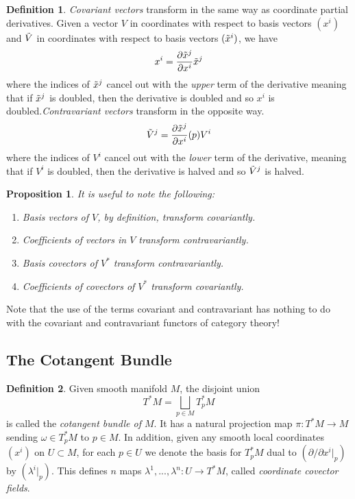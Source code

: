 \documentclass{article}
\newtheorem{proposition}[theorem]{Proposition}
\theoremstyle{remark}
\theoremstyle{definition}
\newtheorem{definition}{Definition}[section]
\begin{document}
      \begin{definition}
      \textit{Covariant vectors} transform in the same way as coordinate partial derivatives. Given a vector $V$ in coordinates with respect to basis vectors $(x^i)$ and $\Tilde{V}$ in coordinates with respect to basis vectors $(\Tilde{x}^i)$, we have
      \[ x^i = \frac{\partial \Tilde{x}^j}{\partial x^i} \Tilde{x}^j\]
      where the indices of $\Tilde{x}^j$ cancel out with the \textit{upper} term of the derivative meaning that if $\Tilde{x}^j$ is doubled, then the derivative is doubled and so $x^i$ is doubled.\textit{Contravariant vectors} transform in the opposite way. 
      \[\Tilde{V}^j = \frac{\partial \Tilde{x}^j}{\partial x^i} (p) V^i\]
      where the indices of $V^i$ cancel out with the \textit{lower} term of the derivative, meaning that if $V^i$ is doubled, then the derivative is halved and so $\Tilde{V}^j$ is halved. 
      \end{definition}

      \begin{proposition}
      It is useful to note the following:
      \begin{enumerate}
          \item Basis vectors of $V$, by definition, transform covariantly. 
          \item Coefficients of vectors in $V$ transform contravariantly. 
          \item Basis covectors of $V^*$ transform contravariantly. 
          \item Coefficients of covectors of $V^*$ transform covariantly. 
      \end{enumerate}
      \end{proposition}

      Note that the use of the terms covariant and contravariant has nothing to do with the covariant and contravariant functors of category theory! 

  \subsection{The Cotangent Bundle}

    \begin{definition}
    Given smooth manifold $M$, the disjoint union 
    \[T^* M = \bigsqcup_{p \in M} T_p^* M\]
    is called the \textit{cotangent bundle of $M$}. It has a natural projection map $\pi: T^* M \longrightarrow M$ sending $\omega \in T_p^* M$ to $p \in M$. In addition, given any smooth local coordinates $(x^i)$ on $U \subset M$, for each $p \in U$ we denote the basis for $T_p^* M$ dual to $(\partial / \partial x^i |_p )$ by $(\lambda^i |_p)$. This defines $n$ maps $\lambda^1, ..., \lambda^n: U \longrightarrow T^* M$, called \textit{coordinate covector fields}. 
    \end{definition}
\end{document}
